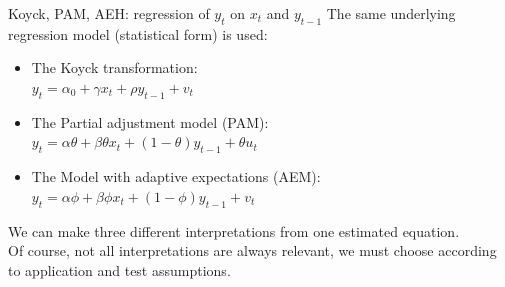\documentclass{beamer}
\begin{document}
\begin{frame}{Koyck, PAM, AEH: regression of $y_t$ on $x_t$ and $y_{t-1}$}
The same underlying regression model (statistical form) is used:

\begin{itemize}
\item The Koyck transformation:\\
$y_t = \alpha_0 + \gamma x_t + \rho y_{t-1} + v_t$\\
\smallskip
\item The Partial adjustment model (PAM):\\
$y_t = \alpha \theta + \beta \theta x_t + (1-\theta) y_{t-1} + \theta u_t$\\
\smallskip
\item The Model with adaptive expectations (AEM):\\
$y_t = \alpha \phi + \beta \phi x_{t} + (1-\phi) y_{t-1} + v_t $\\

\end{itemize}
\vspace{0.3cm}
We can make three different interpretations from one estimated equation.\\
\vspace{0.3cm}
Of course, not all interpretations are always relevant, we must choose according to application and test assumptions.
\end{frame}
\end{document}
